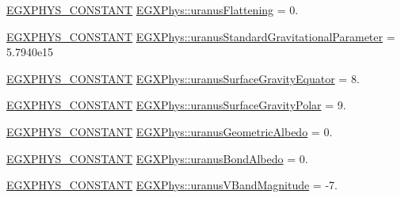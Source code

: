 \begin{DoxyCompactItemize}
\item 
\mbox{\hyperlink{group___e_g_x_phys-_constants-_macros_ga76980d288494ce1714c9ac68a95ba702}{E\+G\+X\+P\+H\+Y\+S\+\_\+\+C\+O\+N\+S\+T\+A\+NT}} \mbox{\hyperlink{group___e_g_x_phys-_constants-_astrophysics-_solar_system-_uranus-_bulk_gae10777496d6d1804e98530f68dcbe150}{E\+G\+X\+Phys\+::uranus\+Flattening}} = 0.
\item 
\mbox{\hyperlink{group___e_g_x_phys-_constants-_macros_ga76980d288494ce1714c9ac68a95ba702}{E\+G\+X\+P\+H\+Y\+S\+\_\+\+C\+O\+N\+S\+T\+A\+NT}} \mbox{\hyperlink{group___e_g_x_phys-_constants-_astrophysics-_solar_system-_uranus-_bulk_ga2638d351b4c8647d718febed6c4d6aa3}{E\+G\+X\+Phys\+::uranus\+Standard\+Gravitational\+Parameter}} = 5.\+7940e15
\item 
\mbox{\hyperlink{group___e_g_x_phys-_constants-_macros_ga76980d288494ce1714c9ac68a95ba702}{E\+G\+X\+P\+H\+Y\+S\+\_\+\+C\+O\+N\+S\+T\+A\+NT}} \mbox{\hyperlink{group___e_g_x_phys-_constants-_astrophysics-_solar_system-_uranus-_bulk_gaf69b423e76cf2feda0f1ea87eedc698b}{E\+G\+X\+Phys\+::uranus\+Surface\+Gravity\+Equator}} = 8.
\item 
\mbox{\hyperlink{group___e_g_x_phys-_constants-_macros_ga76980d288494ce1714c9ac68a95ba702}{E\+G\+X\+P\+H\+Y\+S\+\_\+\+C\+O\+N\+S\+T\+A\+NT}} \mbox{\hyperlink{group___e_g_x_phys-_constants-_astrophysics-_solar_system-_uranus-_bulk_gaac7f0c911f8e118ff773010111851360}{E\+G\+X\+Phys\+::uranus\+Surface\+Gravity\+Polar}} = 9.
\item 
\mbox{\hyperlink{group___e_g_x_phys-_constants-_macros_ga76980d288494ce1714c9ac68a95ba702}{E\+G\+X\+P\+H\+Y\+S\+\_\+\+C\+O\+N\+S\+T\+A\+NT}} \mbox{\hyperlink{group___e_g_x_phys-_constants-_astrophysics-_solar_system-_uranus-_bulk_ga9a1cfdab26c38a850508aa9b1e2409a1}{E\+G\+X\+Phys\+::uranus\+Geometric\+Albedo}} = 0.
\item 
\mbox{\hyperlink{group___e_g_x_phys-_constants-_macros_ga76980d288494ce1714c9ac68a95ba702}{E\+G\+X\+P\+H\+Y\+S\+\_\+\+C\+O\+N\+S\+T\+A\+NT}} \mbox{\hyperlink{group___e_g_x_phys-_constants-_astrophysics-_solar_system-_uranus-_bulk_ga0efbea809d5a024652044e18ac4bf0c5}{E\+G\+X\+Phys\+::uranus\+Bond\+Albedo}} = 0.
\item 
\mbox{\hyperlink{group___e_g_x_phys-_constants-_macros_ga76980d288494ce1714c9ac68a95ba702}{E\+G\+X\+P\+H\+Y\+S\+\_\+\+C\+O\+N\+S\+T\+A\+NT}} \mbox{\hyperlink{group___e_g_x_phys-_constants-_astrophysics-_solar_system-_uranus-_bulk_ga781508a60603feae345f1941de8204fa}{E\+G\+X\+Phys\+::uranus\+V\+Band\+Magnitude}} = -\/7.

\end{DoxyCompactItemize}
